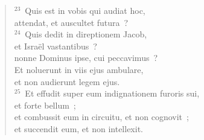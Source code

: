 \begin{flushleft}
\begin{verse}
${}^{23}$~Quis est in vobis qui audiat hoc,\\ attendat, et auscultet futura~?\\
${}^{24}$~Quis dedit in direptionem Jacob,\\ et Isra\"el vastantibus~?\\ nonne Dominus ipse, cui peccavimus~?\\ Et noluerunt in viis ejus ambulare,\\ et non audierunt legem ejus.\\
${}^{25}$~Et effudit super eum indignationem furoris sui,\\ et forte bellum~;\\ et combussit eum in circuitu, et non cognovit~;\\ et succendit eum, et non intellexit.\end{verse}\end{flushleft}


